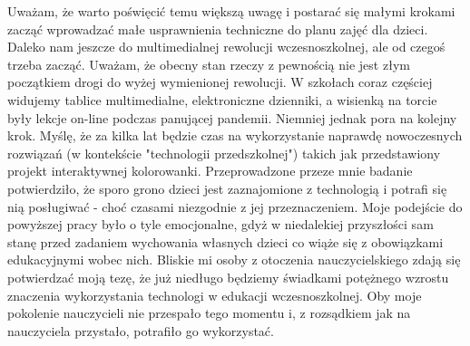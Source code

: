 \documentclass{article}
\begin{document}
\par
Uważam, że warto poświęcić temu większą uwagę i postarać się małymi krokami zacząć wprowadzać małe usprawnienia techniczne do planu zajęć dla dzieci. Daleko nam jeszcze do multimedialnej rewolucji wczesnoszkolnej, ale od czegoś trzeba zacząć. Uważam, że obecny stan rzeczy z pewnością nie jest złym początkiem drogi do wyżej wymienionej rewolucji. W szkołach coraz częściej widujemy tablice multimedialne, elektroniczne dzienniki, a wisienką na torcie były lekcje on-line podczas panującej pandemii. Niemniej jednak pora na kolejny krok. Myślę, że za kilka lat będzie czas na wykorzystanie naprawdę nowoczesnych rozwiązań (w kontekście "technologii przedszkolnej") takich jak przedstawiony projekt interaktywnej kolorowanki. Przeprowadzone przeze mnie badanie potwierdziło, że sporo grono dzieci jest zaznajomione z technologią i potrafi się nią posługiwać - choć czasami niezgodnie z jej przeznaczeniem. Moje podejście do powyższej pracy było o tyle emocjonalne, gdyż w niedalekiej przyszłości sam stanę przed zadaniem wychowania własnych dzieci co wiąże się z obowiązkami edukacyjnymi wobec nich. Bliskie mi osoby z otoczenia nauczycielskiego zdają się potwierdzać moją tezę, że już niedługo będziemy świadkami potężnego wzrostu znaczenia wykorzystania technologi w edukacji wczesnoszkolnej. Oby moje pokolenie nauczycieli nie przespało tego momentu i, z rozsądkiem jak na nauczyciela przystało, potrafiło go wykorzystać.
	
\end{document}
